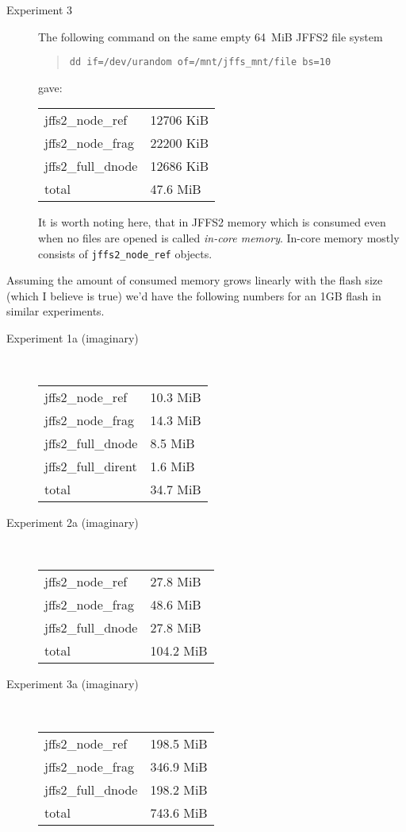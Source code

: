 \documentclass[12pt,a4paper,oneside,titlepage]{article}
\begin{document}
\begin{description}
\item[Experiment 3]
The following command on the same empty 64~MiB JFFS2 file
system
\begin{quote}
\texttt{dd if=/dev/urandom of=/mnt/jffs\_mnt/file bs=10}
\end{quote}
gave:

\begin{center}
\begin{tabular}{ll}
jffs2\_node\_ref    & 12706 KiB \\
jffs2\_node\_frag   & 22200 KiB \\
jffs2\_full\_dnode  & 12686 KiB \\
\hline
total               & 47.6 MiB
\end{tabular}
\end{center}

It is worth noting here, that in JFFS2 memory which is consumed even
when no files are opened is called \emph{\mbox{in-core} memory}.
\mbox{In-core} memory mostly consists of \texttt{jffs2\_node\_ref} objects.
\end{description}

Assuming the amount of consumed memory grows linearly with the flash size
(which I believe is true) we'd have the following numbers for an 1GB flash
in similar experiments.

\begin{description}
\item[Experiment 1a (imaginary)]~
\begin{center}
\begin{tabular}{ll}
jffs2\_node\_ref    & 10.3 MiB \\
jffs2\_node\_frag   & 14.3 MiB \\
jffs2\_full\_dnode  & 8.5 MiB \\
jffs2\_full\_dirent & 1.6 MiB \\
\hline
total               & 34.7 MiB
\end{tabular}
\end{center}

\item[Experiment 2a (imaginary)]~
\begin{center}
\begin{tabular}{ll}
jffs2\_node\_ref    & 27.8 MiB \\
jffs2\_node\_frag   & 48.6 MiB \\
jffs2\_full\_dnode  & 27.8 MiB \\
\hline
total               & 104.2 MiB
\end{tabular}
\end{center}

\item[Experiment 3a (imaginary)]~
\begin{center}
\begin{tabular}{ll}
jffs2\_node\_ref    & 198.5 MiB \\
jffs2\_node\_frag   & 346.9 MiB \\
jffs2\_full\_dnode  & 198.2 MiB \\
\hline
total               & 743.6 MiB
\end{tabular}
\end{center}
\end{description}
\end{document}

